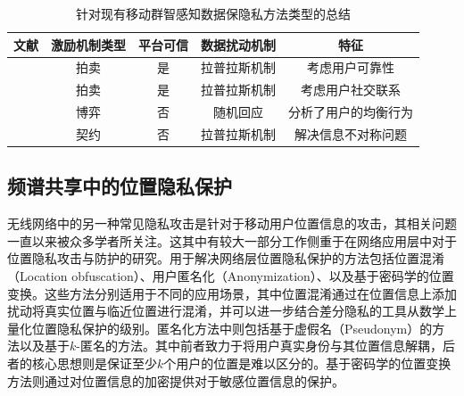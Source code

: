 \begin{table}[!htp]
	\caption{针对现有移动群智感知数据保隐私方法类型的总结}
	\centering
	\tabcolsep=10pt
	\begin{tabular}[c]{|c|c|c|c|c|}
		\hline \label{table:comparison}
		\textbf{文献} & \textbf{激励机制类型} & \textbf{平台可信} &  \textbf{数据扰动机制} & \textbf{特征} \\ \hline
		
		\cite{jin2016inception}  & 拍卖  &   是  &	拉普拉斯机制 & 考虑用户可靠性 \\ \hline

		
		\cite{zhang2016privacy}  & 拍卖  &   是  & 拉普拉斯机制  & 考虑用户社交联系 \\ \hline

		\cite{wang2016value}  & 博弈 &    否   &   随机回应 & 分析了用户的均衡行为	\\ \hline

		\cite{Kun1}  & 契约  & 否  & 拉普拉斯机制 & 解决信息不对称问题 \\ \hline

	\end{tabular}
\end{table}


\subsection{频谱共享中的位置隐私保护}

无线网络中的另一种常见隐私攻击是针对于移动用户位置信息的攻击，其相关问题一直以来被众多学者所关注。这其中有较大一部分工作侧重于在网络应用层中对于位置隐私攻击与防护的研究。用于解决网络层位置隐私保护的方法包括位置混淆（Location obfuscation）\cite{Agrawal:Privacy}、用户匿名化（Anonymization）\cite{Beresford:Mix, Gongjournal, Shin:AnonySense}、以及基于密码学的位置变换\cite{Ghinita:Private, Khoshgozaran:Blind}。这些方法分别适用于不同的应用场景，其中位置混淆通过在位置信息上添加扰动将真实位置与临近位置进行混淆，并可以进一步结合差分隐私的工具从数学上量化位置隐私保护的级别\cite{Dwork:Differential}。匿名化方法中则包括基于虚假名（Pseudonym）的方法\cite{Beresford:Mix}以及基于$k$-匿名的方法\cite{Shin:AnonySense}。其中前者致力于将用户真实身份与其位置信息解耦，后者的核心思想则是保证至少$k$个用户的位置是难以区分的。基于密码学的位置变换方法则通过对位置信息的加密提供对于敏感位置信息的保护。

